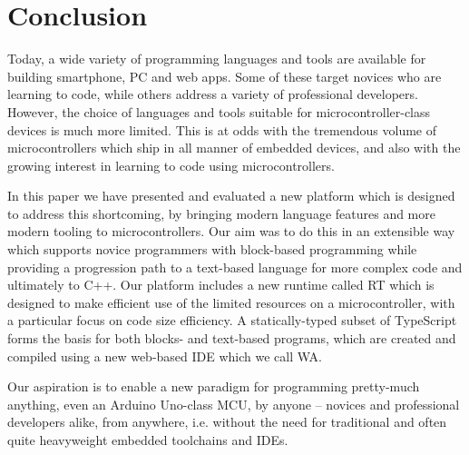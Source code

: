 \section{Conclusion}
\label{sec:conclude}


Today, a wide variety of programming languages and tools are available for building smartphone, PC and web apps. Some of these target novices who are learning to code, while others address a variety of professional developers. However, the choice of languages and tools suitable for microcontroller-class devices is much more limited. This is at odds with the tremendous volume of microcontrollers which ship in all manner of embedded devices, and also with the growing interest in learning to code using microcontrollers. 

In this paper we have presented and evaluated a new platform which is designed to address this shortcoming, by bringing modern language features and more modern tooling to microcontrollers. Our aim was to do this in an extensible way which supports novice programmers with block-based programming while providing a progression path to a text-based language for more complex code and ultimately to C++. Our platform includes a new runtime called RT which is designed to make efficient use of the limited resources on a microcontroller, with a particular focus on code size efficiency. A statically-typed subset of TypeScript forms the basis for both blocks- and text-based programs, which are created and compiled using a new web-based IDE which we call WA.

Our aspiration is to enable a new paradigm for programming pretty-much anything, even an Arduino Uno-class MCU, by anyone -- novices and professional developers alike, from anywhere, i.e. without the need for traditional and often quite heavyweight embedded toolchains and IDEs.

